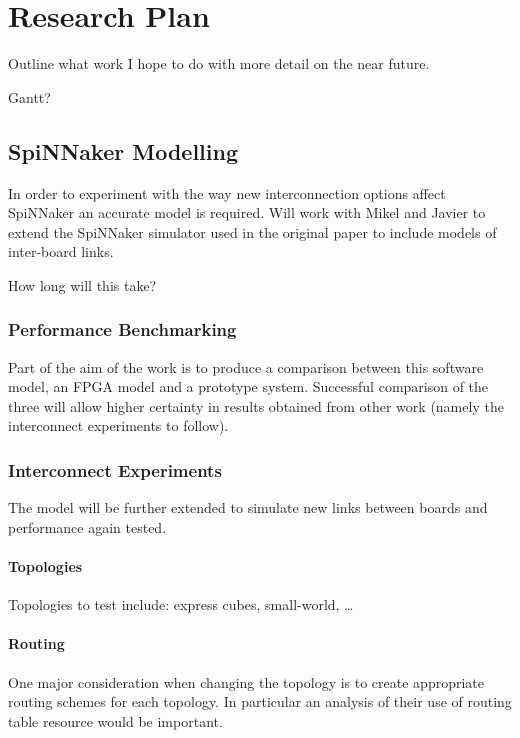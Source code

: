 \chapter{Research Plan}
	
	Outline what work I hope to do with more detail on the near future.
	
	Gantt?
	
	\section{SpiNNaker Modelling}
		
		In order to experiment with the way new interconnection options affect
		SpiNNaker an accurate model is required. Will work with Mikel and Javier to
		extend the SpiNNaker simulator used in the original paper to include models
		of inter-board links.
		
		How long will this take?
		
		\subsection{Performance Benchmarking}
			
			Part of the aim of the work is to produce a comparison between this
			software model, an FPGA model and a prototype system. Successful
			comparison of the three will allow higher certainty in results obtained
			from other work (namely the interconnect experiments to follow).
		
		\subsection{Interconnect Experiments}
			
			The model will be further extended to simulate new links between boards
			and performance again tested.
			
				\subsubsection{Topologies}
					
					Topologies to test include: express cubes, small-world, \ldots
				
				\subsubsection{Routing}
					
					One major consideration when changing the topology is to create
					appropriate routing schemes for each topology. In particular an
					analysis of their use of routing table resource would be important.
		
